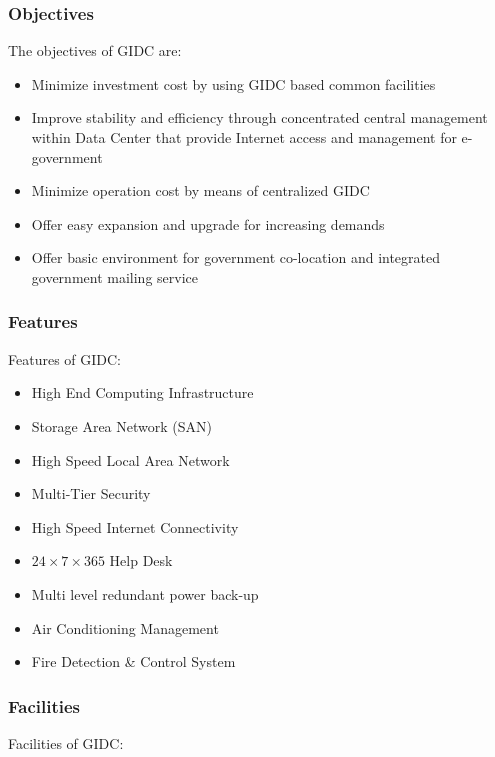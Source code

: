 \subsubsection*{Objectives}
The objectives of GIDC are:
\begin{itemize}
	\item Minimize investment cost by using GIDC based common facilities
	\item Improve stability and efficiency through concentrated central management within Data Center that provide Internet access and management for e-government
	\item Minimize operation cost by means of centralized GIDC
	\item Offer easy expansion and upgrade for increasing demands
	\item Offer basic environment for government co-location and integrated government mailing service
\end{itemize}

\subsubsection*{Features}
Features of GIDC:

\begin{itemize}
	\item High End Computing Infrastructure
	\item Storage Area Network (SAN)
	\item High Speed Local Area Network
\item Multi-Tier Security
	\item High Speed Internet Connectivity
\item $ 24 \times 7\times 365 $ Help Desk
\item Multi level redundant power back-up
\item Air Conditioning Management
\item Fire Detection \& Control System
\end{itemize}

\subsubsection*{Facilities}
Facilities of GIDC:

